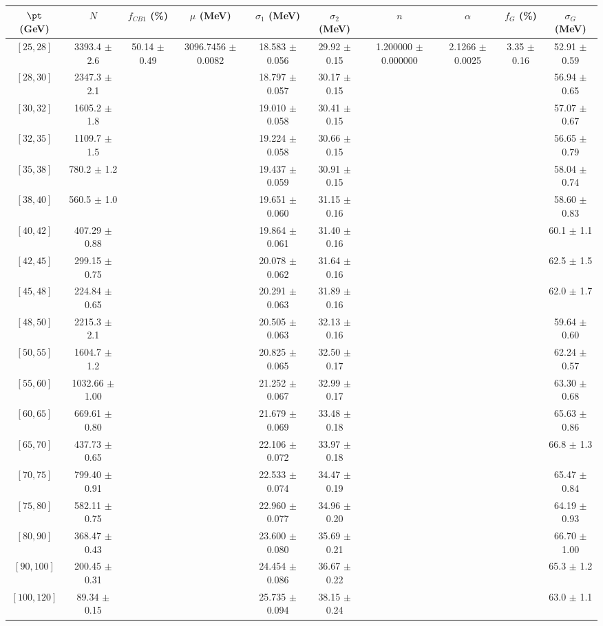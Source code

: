 \begin{tabular}{c||c|c|c|c|c|c|c|c|c}
$\pt$ (GeV) & $N$ & $f_{CB1}$ (\%)  & $\mu$ (MeV) & $\sigma_1$ (MeV) & $\sigma_2$ (MeV) & $n$ & $\alpha$ & $f_G$ (\%) & $\sigma_G$ (MeV) \\
\hline
$[25, 28]$ & 3393.4 $\pm$ 2.6 & \multirow{19}{*}{50.14 $\pm$ 0.49} & \multirow{19}{*}{3096.7456 $\pm$ 0.0082} & 18.583 $\pm$ 0.056 & 29.92 $\pm$ 0.15 & \multirow{19}{*}{1.200000 $\pm$ 0.000000} & \multirow{19}{*}{2.1266 $\pm$ 0.0025} & \multirow{19}{*}{3.35 $\pm$ 0.16} & 52.91 $\pm$ 0.59\\
$[28, 30]$ & 2347.3 $\pm$ 2.1 &  &  & 18.797 $\pm$ 0.057 & 30.17 $\pm$ 0.15 &  &  &  & 56.94 $\pm$ 0.65\\
$[30, 32]$ & 1605.2 $\pm$ 1.8 &  &  & 19.010 $\pm$ 0.058 & 30.41 $\pm$ 0.15 &  &  &  & 57.07 $\pm$ 0.67\\
$[32, 35]$ & 1109.7 $\pm$ 1.5 &  &  & 19.224 $\pm$ 0.058 & 30.66 $\pm$ 0.15 &  &  &  & 56.65 $\pm$ 0.79\\
$[35, 38]$ & 780.2 $\pm$ 1.2 &  &  & 19.437 $\pm$ 0.059 & 30.91 $\pm$ 0.15 &  &  &  & 58.04 $\pm$ 0.74\\
$[38, 40]$ & 560.5 $\pm$ 1.0 &  &  & 19.651 $\pm$ 0.060 & 31.15 $\pm$ 0.16 &  &  &  & 58.60 $\pm$ 0.83\\
$[40, 42]$ & 407.29 $\pm$ 0.88 &  &  & 19.864 $\pm$ 0.061 & 31.40 $\pm$ 0.16 &  &  &  & 60.1 $\pm$ 1.1\\
$[42, 45]$ & 299.15 $\pm$ 0.75 &  &  & 20.078 $\pm$ 0.062 & 31.64 $\pm$ 0.16 &  &  &  & 62.5 $\pm$ 1.5\\
$[45, 48]$ & 224.84 $\pm$ 0.65 &  &  & 20.291 $\pm$ 0.063 & 31.89 $\pm$ 0.16 &  &  &  & 62.0 $\pm$ 1.7\\
$[48, 50]$ & 2215.3 $\pm$ 2.1 &  &  & 20.505 $\pm$ 0.063 & 32.13 $\pm$ 0.16 &  &  &  & 59.64 $\pm$ 0.60\\
$[50, 55]$ & 1604.7 $\pm$ 1.2 &  &  & 20.825 $\pm$ 0.065 & 32.50 $\pm$ 0.17 &  &  &  & 62.24 $\pm$ 0.57\\
$[55, 60]$ & 1032.66 $\pm$ 1.00 &  &  & 21.252 $\pm$ 0.067 & 32.99 $\pm$ 0.17 &  &  &  & 63.30 $\pm$ 0.68\\
$[60, 65]$ & 669.61 $\pm$ 0.80 &  &  & 21.679 $\pm$ 0.069 & 33.48 $\pm$ 0.18 &  &  &  & 65.63 $\pm$ 0.86\\
$[65, 70]$ & 437.73 $\pm$ 0.65 &  &  & 22.106 $\pm$ 0.072 & 33.97 $\pm$ 0.18 &  &  &  & 66.8 $\pm$ 1.3\\
$[70, 75]$ & 799.40 $\pm$ 0.91 &  &  & 22.533 $\pm$ 0.074 & 34.47 $\pm$ 0.19 &  &  &  & 65.47 $\pm$ 0.84\\
$[75, 80]$ & 582.11 $\pm$ 0.75 &  &  & 22.960 $\pm$ 0.077 & 34.96 $\pm$ 0.20 &  &  &  & 64.19 $\pm$ 0.93\\
$[80, 90]$ & 368.47 $\pm$ 0.43 &  &  & 23.600 $\pm$ 0.080 & 35.69 $\pm$ 0.21 &  &  &  & 66.70 $\pm$ 1.00\\
$[90, 100]$ & 200.45 $\pm$ 0.31 &  &  & 24.454 $\pm$ 0.086 & 36.67 $\pm$ 0.22 &  &  &  & 65.3 $\pm$ 1.2\\
$[100, 120]$ & 89.34 $\pm$ 0.15 &  &  & 25.735 $\pm$ 0.094 & 38.15 $\pm$ 0.24 &  &  &  & 63.0 $\pm$ 1.1\\
\end{tabular}

